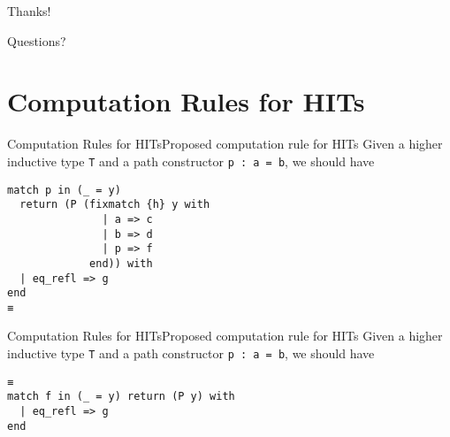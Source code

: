 \documentclass{beamer}
\begin{document}
\begin{frame}
\Huge\begin{center}
Thanks!

Questions?
\end{center}
\end{frame}

\appendix


\section{Computation Rules for HITs} \label{sec:comp-hit}

\begin{frame}[fragile]{Computation Rules for HITs}{Proposed computation rule for HITs}
\Large
Given a higher inductive type \verb|T| and a path constructor \verb|p : a = b|, we should have
\begin{verbatim}
match p in (_ = y)
  return (P (fixmatch {h} y with 
               | a => c
               | b => d
               | p => f
             end)) with
  | eq_refl => g
end
≡
\end{verbatim}
\end{frame}


\begin{frame}[fragile]{Computation Rules for HITs}{Proposed computation rule for HITs}
\Large
Given a higher inductive type \verb|T| and a path constructor \verb|p : a = b|, we should have
\begin{verbatim}
≡
match f in (_ = y) return (P y) with
  | eq_refl => g
end





\end{verbatim}
\end{frame}
\end{document}
